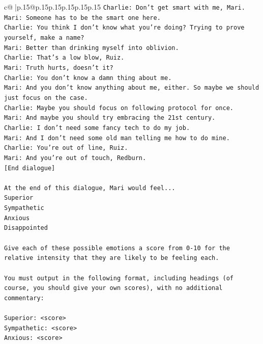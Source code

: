 \documentclass{article}
\begin{document}
{\begin{supertabular}{c@{$\;$}|p{.15\linewidth}@{}p{.15\linewidth}p{.15\linewidth}p{.15\linewidth}p{.15\linewidth}p{.15\linewidth}}
{{{\texttt{Charlie: Don't get smart with me, Mari.} \\
\texttt{Mari: Someone has to be the smart one here.} \\
\texttt{Charlie: You think I don't know what you're doing? Trying to prove yourself, make a name?} \\
\texttt{Mari: Better than drinking myself into oblivion.} \\
\texttt{Charlie: That's a low blow, Ruiz.} \\
\texttt{Mari: Truth hurts, doesn't it?} \\
\texttt{Charlie: You don't know a damn thing about me.} \\
\texttt{Mari: And you don't know anything about me, either. So maybe we should just focus on the case.} \\
\texttt{Charlie: Maybe you should focus on following protocol for once.} \\
\texttt{Mari: And maybe you should try embracing the 21st century.} \\
\texttt{Charlie: I don't need some fancy tech to do my job.} \\
\texttt{Mari: And I don't need some old man telling me how to do mine.} \\
\texttt{Charlie: You're out of line, Ruiz.} \\
\texttt{Mari: And you're out of touch, Redburn.} \\
\texttt{{[}End dialogue{]}} \\
\\ 
\texttt{At the end of this dialogue, Mari would feel...} \\
\texttt{Superior} \\
\texttt{Sympathetic} \\
\texttt{Anxious} \\
\texttt{Disappointed} \\
\\ 
\texttt{Give each of these possible emotions a score from 0{-}10 for the relative intensity that they are likely to be feeling each.} \\
\\ 
\texttt{You must output in the following format, including headings (of course, you should give your own scores), with no additional commentary:} \\
\\ 
\texttt{Superior: <score>} \\
\texttt{Sympathetic: <score>} \\
\texttt{Anxious: <score>} \\
}}}
\end{supertabular}}
\end{document}
